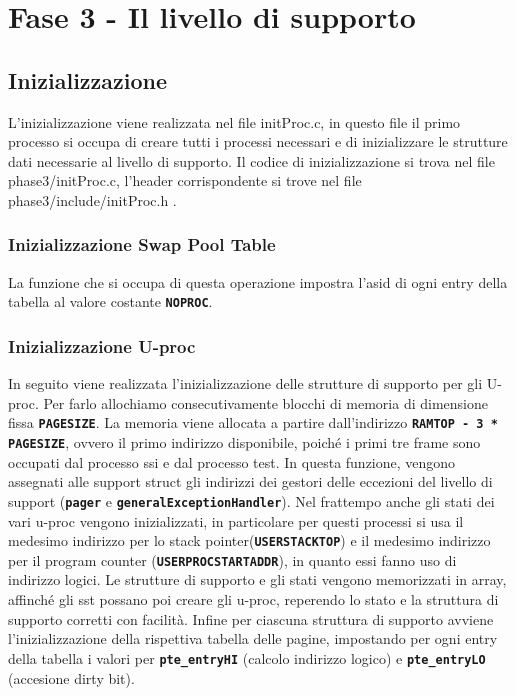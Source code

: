 \documentclass{article}
\begin{document}
\newpage

\section{Fase 3 - Il livello di supporto}
\subsection{Inizializzazione}
L'inizializzazione viene realizzata nel file initProc.c, in questo file il primo processo si occupa di creare tutti i processi necessari e di inizializzare le strutture dati necessarie al  livello di supporto.  
Il codice di inizializzazione si trova nel file phase3/initProc.c, l'header corrispondente
si trove nel file phase3/include/initProc.h .
\subsubsection{Inizializzazione Swap Pool Table}
La funzione che si occupa di questa operazione impostra l'asid di ogni entry della tabella
al valore costante \texttt{\textbf{NOPROC}}.
\subsubsection{Inizializzazione U-proc}
In seguito viene realizzata l'inizializzazione delle strutture di supporto per gli U-proc.
Per farlo allochiamo consecutivamente blocchi di memoria di dimensione fissa \texttt{\textbf{PAGESIZE}}. 
La memoria viene allocata a partire dall'indirizzo \texttt{\textbf{RAMTOP - 3 * PAGESIZE}}, 
ovvero il primo indirizzo disponibile, poiché i primi tre frame sono occupati dal 
processo ssi e dal processo test. In questa funzione, vengono assegnati alle support struct gli indirizzi dei gestori
delle eccezioni del livello di support (\texttt{\textbf{pager}} e \texttt{\textbf{generalExceptionHandler}}).
Nel frattempo anche gli stati dei vari u-proc vengono inizializzati, in particolare per questi processi si usa il 
medesimo indirizzo per lo stack pointer(\texttt{\textbf{USERSTACKTOP}}) e il medesimo indirizzo per il program counter 
(\texttt{\textbf{USERPROCSTARTADDR}}), in quanto essi fanno uso di 
indirizzo logici. Le strutture di supporto e gli stati vengono memorizzati in array, affinché gli sst possano poi 
creare gli u-proc, reperendo lo stato e la struttura di supporto corretti con facilità.
Infine per ciascuna struttura di supporto avviene l'inizializzazione della rispettiva tabella delle pagine, impostando
per ogni entry della tabella i valori per \texttt{\textbf{pte\_entryHI}} (calcolo indirizzo logico) e 
\texttt{\textbf{pte\_entryLO}} (accesione dirty bit).
\end{document}
